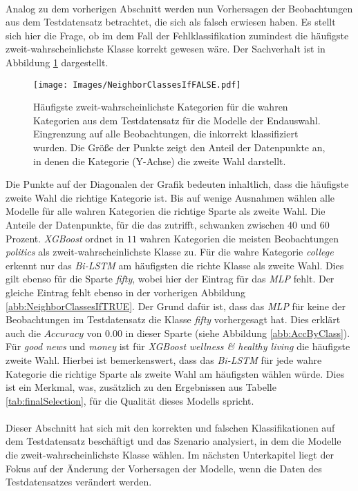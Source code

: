 \documentclass[a4paper,11pt]{article}
\begin{document}
\\
Analog zu dem vorherigen Abschnitt werden nun Vorhersagen der Beobachtungen aus dem Testdatensatz betrachtet, die sich als falsch erwiesen haben. Es stellt sich hier die Frage, ob im dem Fall der Fehlklassifikation zumindest die häufigste zweit-wahrscheinlichste Klasse korrekt gewesen wäre. Der Sachverhalt ist in Abbildung \ref{abb:NeighborClassesIfFALSE} dargestellt.

\begin{figure}[ht]
    \centering
\texttt{[image: Images/NeighborClassesIfFALSE.pdf]} 
\caption{Häufigste zweit-wahrscheinlichste Kategorien für die wahren Kategorien aus dem Testdatensatz für die Modelle der Endauswahl. Eingrenzung auf alle Beobachtungen, die inkorrekt klassifiziert wurden. Die Größe der Punkte zeigt den Anteil der Datenpunkte an, in denen die Kategorie (Y-Achse) die zweite Wahl darstellt.}
\label{abb:NeighborClassesIfFALSE}
\end{figure}

Die Punkte auf der Diagonalen der Grafik bedeuten inhaltlich, dass die häufigste zweite Wahl die richtige Kategorie ist. Bis auf wenige Ausnahmen wählen alle Modelle für alle wahren Kategorien die richtige Sparte als zweite Wahl. Die Anteile der Datenpunkte, für die das zutrifft, schwanken zwischen $40$ und $60$ Prozent. \textit{XGBoost} ordnet in $11$ wahren Kategorien die meisten Beobachtungen \textit{politics} als zweit-wahrscheinlichste Klasse zu. Für die wahre Kategorie \textit{college} erkennt nur das \textit{Bi-LSTM} am häufigsten die richte Klasse als zweite Wahl. Dies gilt ebenso für die Sparte \textit{fifty}, wobei hier der Eintrag für das \textit{MLP} fehlt. Der gleiche Eintrag fehlt ebenso in der vorherigen Abbildung \ref{abb:NeighborClassesIfTRUE}. Der Grund dafür ist, dass das \textit{MLP} für keine der Beobachtungen im Testdatensatz die Klasse \textit{fifty} vorhergesagt hat. Dies erklärt auch die $Accuracy$ von $0.00$ in dieser Sparte (siehe Abbildung \ref{abb:AccByClass}). Für \textit{good news} und \textit{money} ist für \textit{XGBoost} \textit{wellness \& healthy living} die häufigste zweite Wahl. Hierbei ist bemerkenswert, dass das \textit{Bi-LSTM} für jede wahre Kategorie die richtige Sparte als zweite Wahl am häufigsten wählen würde. Dies ist ein Merkmal, was, zusätzlich zu den Ergebnissen aus Tabelle \ref{tab:finalSelection}, für die Qualität dieses Modells spricht.\\
\\
Dieser Abschnitt hat sich mit den korrekten und falschen Klassifikationen auf dem Testdatensatz beschäftigt und das Szenario analysiert, in dem die Modelle die zweit-wahrscheinlichste Klasse wählen. Im nächsten Unterkapitel liegt der Fokus auf der Änderung der Vorhersagen der Modelle, wenn die Daten des Testdatensatzes verändert werden.
\end{document}
